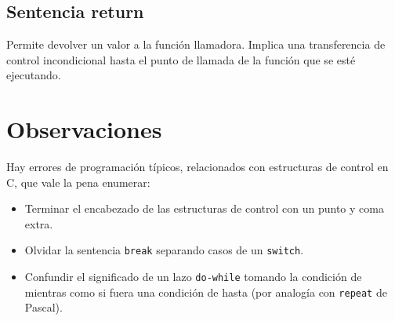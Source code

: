 \subsection{Sentencia return}
Permite devolver un valor a la función llamadora. Implica una transferencia de
control incondicional hasta el punto de llamada de la función que se esté
ejecutando.

\section{Observaciones}
Hay errores de programación típicos, relacionados con estructuras de control en
C, que vale la pena enumerar:
\begin{itemize}
	\item Terminar el encabezado de las estructuras de control con un punto y coma
      extra.
    \item Olvidar la sentencia \lstinline{break} separando casos de un \lstinline{switch}.
    \item Confundir el significado de un lazo \lstinline{do-while} tomando la condición de
      mientras como si fuera una condición de hasta (por analogía con \lstinline{repeat} de
      Pascal).
\end{itemize}
    



